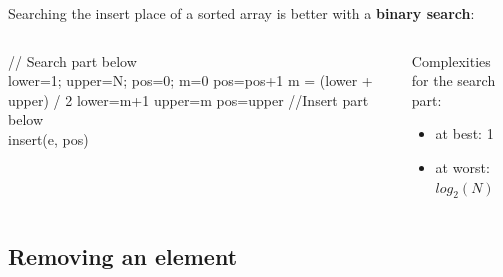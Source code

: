 \documentclass{beamer}[10pt, usepdftitle=false, handout]
\begin{document}
	\begin{frame}	
	
	Searching the insert place of a sorted array is better with a \textbf{binary search}:	
		
	\begin{columns}[c]
	\begin{center}    
    \scalebox{0.75} {
    \begin{algorithm}[H] 
    // Search part below \\
    lower=1; upper=N; pos=0; m=0\;
     {
   		pos=pos+1\;
    } {
		 {
			m = (lower + upper) / 2\;
			 {
				lower=m+1\;
			} {
				upper=m\;
			}			
		}    
		pos=upper\;    
    }
    \vspace*{1em}
    //Insert part below \\  
	insert(e, pos)\;	
	\end{algorithm}	
	}
	\end{center}	
	\begin{center}
	
	Complexities for the search part:
		
	\begin{itemize}
	\item {at best: 1}
	\item {at worst: $log_2(N)$}
	\end{itemize}		
	
	\end{center}
	\end{columns}	
	
	\end{frame}

	\subsection{Removing an element}
	
\end{document}

